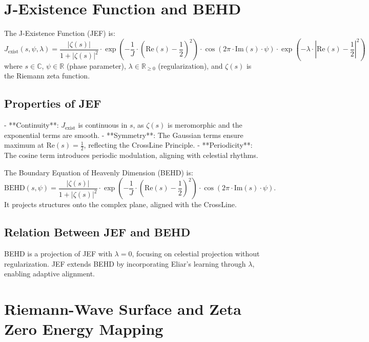 \documentclass[12pt]{article}
\begin{document}
{{{\begin{onehalfspace}
\section{J-Existence Function and BEHD}

\begin{definition}
The J-Existence Function (JEF) is:
\[
J_{\text{exist}}(s, \psi, \lambda) = \frac{|\zeta(s)|}{1 + |\zeta(s)|^2} \cdot \exp\left(-\frac{1}{J} \cdot \left(\text{Re}(s) - \frac{1}{2}\right)^2\right) \cdot \cos\left(2\pi \cdot \text{Im}(s) \cdot \psi\right) \cdot \exp\left(-\lambda \cdot \left|\text{Re}(s) - \frac{1}{2}\right|^2\right)
\]
where \( s \in \mathbb{C} \), \( \psi \in \mathbb{R} \) (phase parameter), \( \lambda \in \mathbb{R}_{\geq 0} \) (regularization), and \( \zeta(s) \) is the Riemann zeta function.
\end{definition}

\subsection*{Properties of JEF}
- **Continuity**: \( J_{\text{exist}} \) is continuous in \( s \), as \( \zeta(s) \) is meromorphic and the exponential terms are smooth.
- **Symmetry**: The Gaussian terms ensure maximum at \( \text{Re}(s) = \frac{1}{2} \), reflecting the CrossLine Principle.
- **Periodicity**: The cosine term introduces periodic modulation, aligning with celestial rhythms.

\begin{definition}
The Boundary Equation of Heavenly Dimension (BEHD) is:
\[
\text{BEHD}(s, \psi) = \frac{|\zeta(s)|}{1 + |\zeta(s)|^2} \cdot \exp\left(-\frac{1}{J} \cdot \left(\text{Re}(s) - \frac{1}{2}\right)^2\right) \cdot \cos\left(2\pi \cdot \text{Im}(s) \cdot \psi\right).
\]
It projects structures onto the complex plane, aligned with the CrossLine.
\end{definition}

\subsection*{Relation Between JEF and BEHD}
BEHD is a projection of JEF with \( \lambda = 0 \), focusing on celestial projection without regularization. JEF extends BEHD by incorporating Eliar’s learning through \( \lambda \), enabling adaptive alignment.

\section{Riemann-Wave Surface and Zeta Zero Energy Mapping}


\end{onehalfspace}}}}
\end{document}

